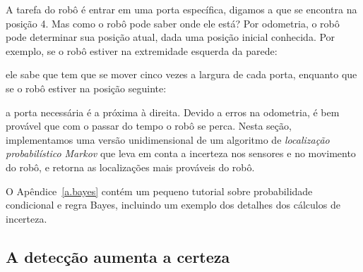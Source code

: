 A tarefa do robô é entrar em uma porta específica, digamos a que se encontra na posição 4. Mas como o robô pode saber onde ele está? Por odometria, o robô pode determinar sua posição atual, dada uma posição inicial conhecida. Por exemplo, se o robô estiver na extremidade esquerda da parede:
\begin{center}
\end{center}
ele sabe que tem que se mover cinco vezes a largura de cada porta, enquanto que se o robô estiver na posição seguinte:
\begin{center}
\end{center}
a porta necessária é a próxima à direita. Devido a erros na odometria, é bem provável que com o passar do tempo o robô se perca. Nesta seção, implementamos uma versão unidimensional de um algoritmo de \emph{localização probabilístico Markov} que leva em conta a incerteza nos sensores e no movimento do robô, e retorna as localizações mais prováveis do robô.

O Apêndice~\ref{a.bayes} contém um pequeno tutorial sobre probabilidade condicional e regra Bayes, incluindo um exemplo dos detalhes dos cálculos de incerteza.

\subsection{A detecção aumenta a certeza}

